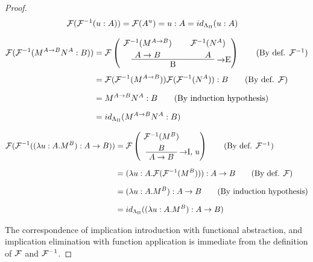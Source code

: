 \begin{proof}
\begin{align*}
\mathcal{F}(\mathcal{F}^{-1}(u:A)) & = \mathcal{F}(A^u) = u:A = id_{\Lambda_\Pi}(u:A)
\end{align*}

\begin{align*}
\chmap(\chmapanta(M^{A \to B}N^A:B)) & =
  \chmap\left(
  \AxiomC{$\chmapanta(M^{A \to B})$}
  \noLine
  \UnaryInfC{$A \to B$}
  \AxiomC{$\chmapanta(N^A)$}
  \noLine
  \UnaryInfC{$A$}
  \RightLabel{$\to$E}
  \BinaryInfC{B}
  \DisplayProof
  \right) \tag{By def. $\chmapanta$}\\[4pt]
& =
  \chmap(\chmapanta(M^{A \to B}))\chmap(\chmapanta(N^A)): B
  \tag{By def.  $\chmap$}\\[6pt]
& =
  M^{A \to B}N^A:B
  \tag{By induction hypothesis}\\[6pt]
& =
  id_{\stlambdaterms}(M^{A \to B}N^A:B)
\end{align*}

\begin{align*}
\chmap(\chmapanta((\lambda u:A.M^B):A \to B)) &=
  \chmap\left(
  \AxiomC{$\chmapanta(M^B)$}
  \noLine
  \UnaryInfC{$B$}
  \RightLabel{$\to$I, $u$}
  \UnaryInfC{$A \to B$}
  \DisplayProof
  \right) \tag{By def. $\chmapanta$} \\[6pt]
& =
  (\lambda u: A.\chmap(\chmapanta(M^B))): A \to B
  \tag{By def. $\chmap$} \\[6pt]
& =
  (\lambda u: A.M^B): A \to B
  \tag{By induction hypothesis} \\[6pt]
& =
  id_{\stlambdaterms}((\lambda u: A.M^B): A \to B)
\end{align*}

The correspondence of implication introduction with functional abstraction, and
implication elimination with function application is immediate from the
definition of $\mathcal{F}$ and $\mathcal{F}^{-1}$.
\end{proof}
